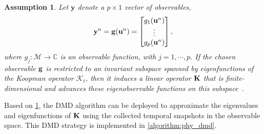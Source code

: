 \documentclass[10pt]{article}
\numberwithin{equation}{section}
\theoremstyle{plain}
\newtheorem{assumption}{\bf Assumption}[section]
\theoremstyle{remark}
\theoremstyle{remark}
\begin{document}
\begin{assumption}\label{ass:a2}
Let $\mathbf y$ denote a $p \times 1$ vector of observables,
\begin{equation}\label{eq:2-13}
\bold y^n = \bold g(\bold u^{n}) = \begin{bmatrix}
g_1(\bold u^n)\\
\vdots\\
g_p(\bold u^n)
\end{bmatrix},
\end{equation} 
where $g_j: \mathcal M \to \mathbb C$ is an observable function, with $j =1,\cdots, p$. If the chosen observable $\bold g$ is restricted to an invariant subspace spanned by eigenfunctions of the Koopman operator $\mathcal K_t$, then it induces a linear operator $\bold K$ that is finite-dimensional and advances these eigenobservable functions on this subspace~\cite{brunton2016koopman}.
\end{assumption}

Based on \cref{ass:a2}, the DMD algorithm can be deployed to approximate the eigenvalues and eigenfunctions of $\bold K$ using the collected temporal snapshots in the observable space. This DMD strategy is implemented in \cref{algorithm:phy_dmd}.
\end{document}
